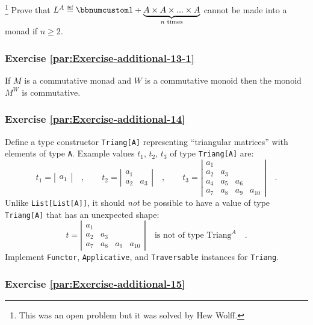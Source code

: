 \footnote{This was an open problem but it was solved by Hew Wolff.}
Prove that $L^{A}\triangleq\bbnum 1+\underbrace{A\times A\times...\times A}_{n\text{ times}}$
cannot be made into a monad if $n\ge2$.

\subsubsection{Exercise \label{par:Exercise-additional-13-1}\ref{par:Exercise-additional-13-1}}

If $M$ is a commutative monad and $W$ is a commutative monoid then
the monoid $M^{W}$ is commutative.

\subsubsection{Exercise \label{par:Exercise-additional-14}\ref{par:Exercise-additional-14}}

Define a type constructor \lstinline!Triang[A]! representing \textsf{``}triangular
matrices\textsf{''} with elements of type \lstinline!A!. Example values $t_{1}$,
$t_{2}$, $t_{3}$ of type \lstinline!Triang[A]! are:
\[
t_{1}=\left|\begin{array}{c}
a_{1}\end{array}\right|\quad,\quad\quad t_{2}=\left|\begin{array}{cc}
a_{1}\\
a_{2} & a_{3}
\end{array}\right|\quad,\quad\quad t_{3}=\left|\begin{array}{cccc}
a_{1}\\
a_{2} & a_{3}\\
a_{4} & a_{5} & a_{6}\\
a_{7} & a_{8} & a_{9} & a_{10}
\end{array}\right|\quad.
\]
Unlike \lstinline!List[List[A]]!, it should \emph{not} be possible
to have a value of type \lstinline!Triang[A]! that has an unexpected
shape:
\[
t=\left|\begin{array}{cccc}
a_{1}\\
a_{2} & a_{3}\\
a_{7} & a_{8} & a_{9} & a_{10}
\end{array}\right|\quad\text{is not of type }\text{Triang}^{A}\quad.
\]
 Implement \lstinline!Functor!, \lstinline!Applicative!, and \lstinline!Traversable!
instances for \lstinline!Triang!.

\subsubsection{Exercise \label{par:Exercise-additional-15}\ref{par:Exercise-additional-15}}

